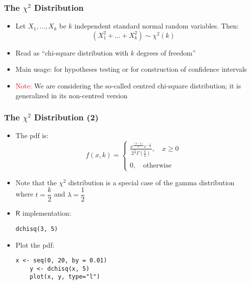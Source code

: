 \documentclass[10pt]{beamer}
\theoremstyle{definition}
\begin{document}
\begin{frame}[fragile]
\frametitle{The $\chi^{2}$ Distribution}
\begin{itemize}
	\item Let $X_{1}, \ldots, X_{k}$ be $k$ independent standard normal random variables. Then: 
	\[
		(X_{1}^{2} + \ldots + X_{k}^{2}) \sim \chi^{2} (k)
	\]

	\item Read as ``chi-square distribution with $k$ degrees of freedom''

	\item Main usage: for hypotheses testing or for construction of confidence intervals

	\item \textcolor{red}{Note:} We are considering the so-called centred chi-square distribution; it is generalized in its non-centred version
	\end{itemize}
\end{frame}

\begin{frame}[fragile]
\frametitle{The $\chi^{2}$ Distribution (2)}
\begin{itemize}
	\item The pdf is:
	\[
		f(x,k) = 
		\left\{
		\begin{array}{l}
			\displaystyle\frac{x^{\frac{(k-2)}{2}}e^{-\frac{x}{2}}}{2^{\frac{k}{2}}\Gamma\left(\frac{k}{2}\right)},\quad x \geq 0\\
			\quad\\
			0,\quad \textrm{otherwise}
		\end{array}
		\right.
		\]

	\item Note that the $ \chi^{2} $ distribution is a special case of the gamma distribution where $ t = \dfrac{k}{2} $ and $ \lambda = \dfrac{1}{2} $

	\item $\mathsf{R}$ implementation:
	\begin{lstlisting}[style = rstyle, breaklines]
	dchisq(3, 5)
	\end{lstlisting}

	\item Plot the pdf:
	\begin{lstlisting}[style = rstyle, breaklines]
	x <- seq(0, 20, by = 0.01)
	y <- dchisq(x, 5)
	plot(x, y, type="l")
	\end{lstlisting}
\end{itemize}
\end{frame}
\end{document}
